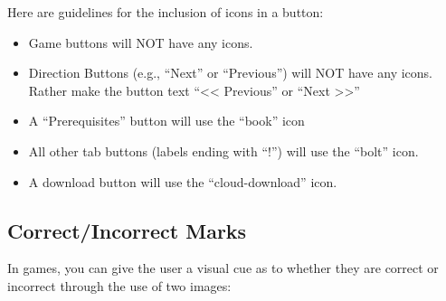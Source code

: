 \documentclass[
]{book}
\providecommand{\tightlist}{%
  \setlength{\itemsep}{0pt}\setlength{\parskip}{0pt}}
\begin{document}
Here are guidelines for the inclusion of icons in a button:

\begin{itemize}
\tightlist
\item
  Game buttons will NOT have any icons.
\item
  Direction Buttons (e.g., ``Next'' or ``Previous'') will NOT have any icons. Rather make the button text ``\textless\textless{} Previous'' or ``Next \textgreater\textgreater{}''
\item
  A ``Prerequisites'' button will use the ``book'' icon
\item
  All other tab buttons (labels ending with ``!'') will use the ``bolt'' icon.
\item
  A download button will use the ``cloud-download'' icon.
\end{itemize}

\hypertarget{correctincorrect-marks}{%
\subsection{Correct/Incorrect Marks}\label{correctincorrect-marks}}

In games, you can give the user a visual cue as to whether they are correct or incorrect through the use of two images:
\end{document}
